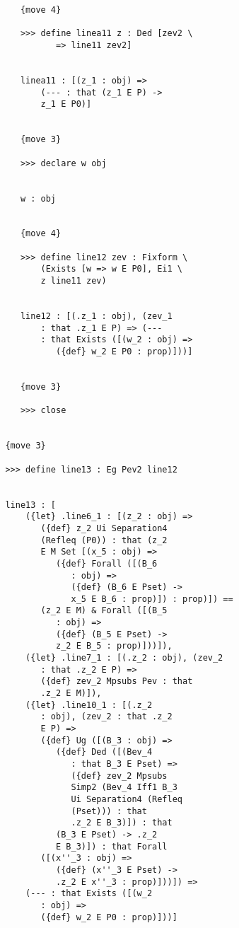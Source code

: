 \documentclass[12pt]{article}
\begin{document}
\begin{verbatim}
            {move 4}

            >>> define linea11 z : Ded [zev2 \
                   => line11 zev2]


            linea11 : [(z_1 : obj) => 
                (--- : that (z_1 E P) -> 
                z_1 E P0)]


            {move 3}

            >>> declare w obj


            w : obj


            {move 4}

            >>> define line12 zev : Fixform \
                (Exists [w => w E P0], Ei1 \
                z line11 zev)


            line12 : [(.z_1 : obj), (zev_1 
                : that .z_1 E P) => (--- 
                : that Exists ([(w_2 : obj) => 
                   ({def} w_2 E P0 : prop)]))]


            {move 3}

            >>> close


         {move 3}

         >>> define line13 : Eg Pev2 line12


         line13 : [
             ({let} .line6_1 : [(z_2 : obj) => 
                ({def} z_2 Ui Separation4 
                (Refleq (P0)) : that (z_2 
                E M Set [(x_5 : obj) => 
                   ({def} Forall ([(B_6 
                      : obj) => 
                      ({def} (B_6 E Pset) -> 
                      x_5 E B_6 : prop)]) : prop)]) == 
                (z_2 E M) & Forall ([(B_5 
                   : obj) => 
                   ({def} (B_5 E Pset) -> 
                   z_2 E B_5 : prop)]))]), 
             ({let} .line7_1 : [(.z_2 : obj), (zev_2 
                : that .z_2 E P) => 
                ({def} zev_2 Mpsubs Pev : that 
                .z_2 E M)]), 
             ({let} .line10_1 : [(.z_2 
                : obj), (zev_2 : that .z_2 
                E P) => 
                ({def} Ug ([(B_3 : obj) => 
                   ({def} Ded ([(Bev_4 
                      : that B_3 E Pset) => 
                      ({def} zev_2 Mpsubs 
                      Simp2 (Bev_4 Iff1 B_3 
                      Ui Separation4 (Refleq 
                      (Pset))) : that 
                      .z_2 E B_3)]) : that 
                   (B_3 E Pset) -> .z_2 
                   E B_3)]) : that Forall 
                ([(x''_3 : obj) => 
                   ({def} (x''_3 E Pset) -> 
                   .z_2 E x''_3 : prop)]))]) => 
             (--- : that Exists ([(w_2 
                : obj) => 
                ({def} w_2 E P0 : prop)]))]



\end{verbatim}
\end{document}
